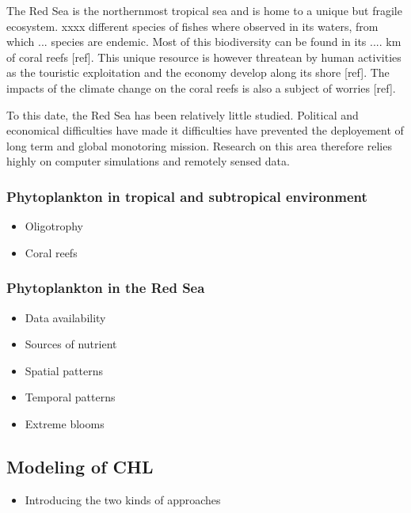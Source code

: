 			The Red Sea is the northernmost tropical sea and is home to a unique but fragile ecosystem. xxxx different species of fishes where observed in its waters, from which ... species are endemic. Most of this biodiversity can be found in its .... km  of coral reefs [ref]. This unique resource is however threatean by human activities as the touristic exploitation and the economy develop along its shore [ref]. The impacts of the climate change on the coral reefs is also a subject of worries [ref]. 

			To this date, the Red Sea has been relatively little studied. Political and economical difficulties have made it difficulties have prevented the deployement of long term and global monotoring mission. Research on this area therefore relies highly on computer simulations and remotely sensed data.

		\subsubsection{Phytoplankton in tropical and subtropical environment}

			\begin{itemize}
				\item Oligotrophy
				\item Coral reefs
			\end{itemize}

		\subsubsection{Phytoplankton in the Red Sea}

			\begin{itemize}
				\item Data availability
				\item Sources of nutrient
				\item Spatial patterns
				\item Temporal patterns
				\item Extreme blooms
			\end{itemize}

	\subsection{Modeling of CHL}
	\label{intro:context:modeling}

		\begin{itemize}
			\item Introducing the two kinds of approaches
		\end{itemize}

